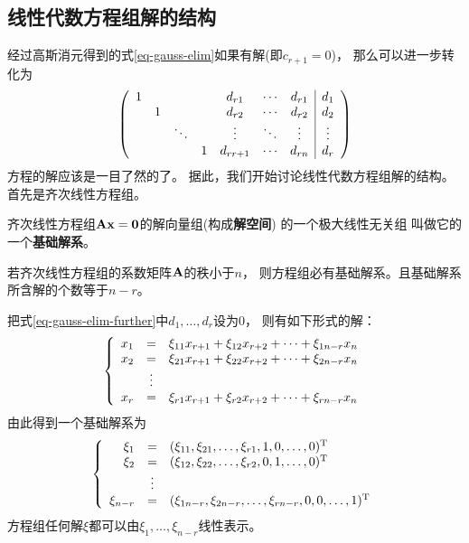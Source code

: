 \subsection{线性代数方程组解的结构}
经过高斯消元得到的式\ref{eq-gauss-elim}如果有解(即$c_{r+1}=0$)，
那么可以进一步转化为
\begin{equation} \label{eq-gauss-elim-further}
  \mmat{ccccccc|c}{
    1 &        &        &   & d_{r1}   & \cdots & d_{r1} & d_1    \\
      & 1      &        &   & d_{r2}   & \cdots & d_{r2} & d_2    \\
      &        & \ddots &   & \vdots   & \ddots & \vdots & \vdots \\
      &        &        & 1 & d_{rr+1} & \cdots & d_{rn} & d_r
  }
\end{equation}
方程的解应该是一目了然的了。
据此，我们开始讨论线性代数方程组解的结构。
首先是齐次线性方程组。

\begin{definition}[基础解系]
  齐次线性方程组$\mmA\mvx=\mvZero$的解向量组(构成\textbf{解空间})
  的一个极大线性无关组
  叫做它的一个\textbf{基础解系}。
\end{definition}

\begin{theorem}
  若齐次线性方程组的系数矩阵$\mmA$的秩小于$n$，
  则方程组必有基础解系。且基础解系所含解的个数等于$n-r$。
\end{theorem}

\begin{remark}
  把式\ref{eq-gauss-elim-further}中$d_1,\dots,d_r$设为0，
  则有如下形式的解：
  \begin{displaymath}
  \meqs{rcl}{
    x_1 &=& \xi_{11}x_{r+1}+\xi_{12}x_{r+2}+\cdots+\xi_{1n-r}x_{n} \\
    x_2 &=& \xi_{21}x_{r+1}+\xi_{22}x_{r+2}+\cdots+\xi_{2n-r}x_{n} \\
    & \vdots & \\
    x_r &=& \xi_{r1}x_{r+1}+\xi_{r2}x_{r+2}+\cdots+\xi_{rn-r}x_{n} \\
  }
  \end{displaymath}
  由此得到一个基础解系为
  \begin{displaymath}
  \meqs{rcl} {
    \xi_1 &=& (\xi_{11}, \xi_{21}, \dots, \xi_{r1}, 1, 0, \dots, 0)^\mT \\
    \xi_2 &=& (\xi_{12}, \xi_{22}, \dots, \xi_{r2}, 0, 1, \dots, 0)^\mT \\
    & \vdots & \\
    \xi_{n-r} &=& (\xi_{1n-r}, \xi_{2n-r}, \dots, \xi_{rn-r}, 0, 0, \dots, 1)^\mT
  }
  \end{displaymath}
  方程组任何解$\xi$都可以由$\xi_1,\dots,\xi_{n-r}$线性表示。
\end{remark}

